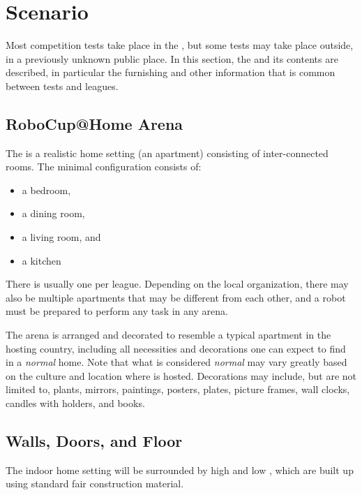 \section{Scenario}
\label{sec:scenario}

Most competition tests take place in the \RoboCup\AtHome\Arena, but some tests may take place outside, in a previously unknown public place.
In this section, the \Arena{} and its contents are described, in particular the furnishing and other information that is common between tests and leagues.

\subsection{RoboCup@Home Arena}

The \RoboCup\AtHome\Arena{} is a realistic home setting (an apartment) consisting of inter-connected rooms.
The minimal configuration consists of:
\begin{itemize}
	\item a bedroom,
	\item a dining room,
	\item a living room, and
	\item a kitchen
\end{itemize}
There is usually one \Arena{} per league.
Depending on the local organization, there may also be multiple apartments that may be different from each other, and a robot must be prepared to perform any task in any arena.

The arena is arranged and decorated to resemble a typical apartment in the hosting country, including all necessities and decorations one can expect to find in a \emph{normal} home.
Note that what is considered \emph{normal} may vary greatly based on the culture and location where \RoboCup{} is hosted.
Decorations may include, but are not limited to, plants, mirrors, paintings, posters, plates, picture frames, wall clocks, candles with holders, and books.

\subsection{Walls, Doors, and Floor}
\label{rule:scenario_walls}

The indoor home setting will be surrounded by high and low , which are built up using standard fair construction material.

